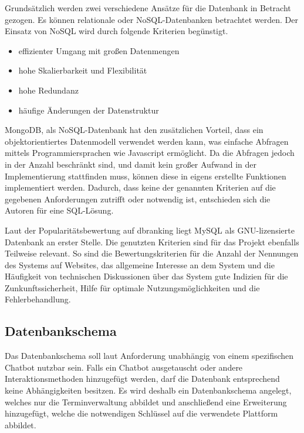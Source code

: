 Grundsätzlich werden zwei verschiedene Ansätze für die Datenbank in Betracht gezogen. Es können relationale oder NoSQL-Datenbanken betrachtet werden. Der Einsatz von NoSQL wird durch folgende Kriterien begünstigt.

\begin{itemize}
	\item effizienter Umgang mit großen Datenmengen
	\item hohe Skalierbarkeit und Flexibilität
	\item hohe Redundanz
	\item häufige Änderungen der Datenstruktur
\end{itemize}

MongoDB, als NoSQL-Datenbank hat den zusätzlichen Vorteil, dass ein objektorientiertes Datenmodell verwendet werden kann, was einfache Abfragen mittels Programmiersprachen wie Javascript ermöglicht. Da die Abfragen jedoch in der Anzahl beschränkt sind, und damit kein großer Aufwand in der Implementierung stattfinden muss, können diese in eigens erstellte Funktionen implementiert werden. Dadurch, dass keine der genannten Kriterien auf die gegebenen Anforderungen zutrifft oder notwendig ist, entschieden sich die Autoren für eine SQL-Lösung.

Laut der Popularitätsbewertung auf {dbranking} liegt MySQL als GNU-lizensierte Datenbank an erster Stelle. Die genutzten Kriterien sind für das Projekt ebenfalls Teilweise relevant. So sind die Bewertungskriterien für die Anzahl der Nennungen des Systems auf Websites, das allgemeine Interesse an dem System und die Häufigkeit von technischen Diskussionen über das System gute Indizien für die Zunkunftssicherheit, Hilfe für optimale Nutzungsmöglichkeiten und die Fehlerbehandlung.



\subsection{Datenbankschema}

Das Datenbankschema soll laut Anforderung unabhängig von einem spezifischen Chatbot nutzbar sein. Falls ein Chatbot ausgetauscht oder andere Interaktionsmethoden hinzugefügt werden, darf die Datenbank entsprechend keine Abhängigkeiten besitzen. Es wird deshalb ein Datenbankschema angelegt, welches nur die Terminverwaltung abbildet und anschließend eine Erweiterung hinzugefügt, welche die notwendigen Schlüssel auf die verwendete Plattform abbildet.

